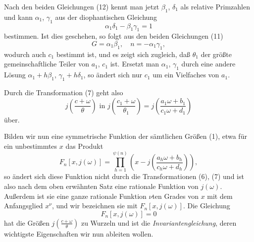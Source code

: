 \documentclass[12pt,a4paper]{article}
\theoremstyle{definition}
\begin{document}
Nach den beiden Gleichungen (12) kennt man jetzt $\beta_1$, $\delta_1$ als relative Primzahlen und kann $\alpha_1$, $\gamma_1$ aus der diophantischen Gleichung
\[
\alpha_1 \delta_1 - \beta_1 \gamma_1 = 1
\]
bestimmen. Ist dies geschehen, so folgt aus den beiden Gleichungen (11)
\[
G = \alpha_1 \beta_1, \quad n = -\alpha_1 \gamma_1,
\]
wodurch auch $c_1$ bestimmt ist, und es zeigt sich zugleich, daß $\theta_1$ der größte gemeinschaftliche Teiler von $a_1$, $c_1$ ist. Ersetzt man $\alpha_1$, $\gamma_1$ durch eine andere Lösung $\alpha_1 + h\beta_1$, $\gamma_1 + h\delta_1$, so ändert sich nur $c_1$ um ein Vielfaches von $a_1$.

Durch die Transformation (7) geht also
\[
j\left(\frac{c + \omega}{\theta}\right) \text{ in } j\left(\frac{c_1 + \omega}{\theta_1}\right) = j\left(\frac{a_1 \omega + b_1}{c_1 \omega + d_1}\right)
\]
über.

Bilden wir nun eine symmetrische Funktion der sämtlichen Größen (1), etwa für ein unbestimmtes $x$ das Produkt
\[
F_n[x, j(\omega)] = \prod_{h=1}^{\psi(n)} \left(x - j\left(\frac{a_h \omega + b_h}{c_h \omega + d_h}\right)\right),
\]
so ändert sich diese Funktion nicht durch die Transformationen (6), (7) und ist also nach dem oben erwähnten Satz eine rationale Funktion von $j(\omega)$. Außerdem ist sie eine ganze rationale Funktion $\nu$ten Grades von $x$ mit dem Anfangsglied $x^\nu$, und wir bezeichnen sie mit $F_n[x, j(\omega)]$. Die Gleichung
\begin{equation}\label{eq:69-14}
F_n[x, j(\omega)] = 0
\end{equation}
hat die Größen $j\left(\frac{c + \omega}{\theta}\right)$ zu Wurzeln und ist die \emph{Invariantengleichung}, deren wichtigste Eigenschaften wir nun ableiten wollen.
\end{document}
